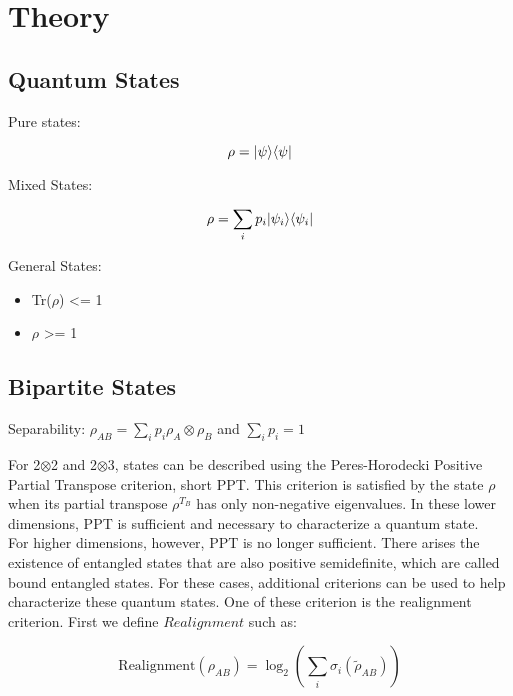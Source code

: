 \chapter{Theory}

\section{Quantum States}

Pure states:

\begin{equation}
    \rho = \lvert\psi\rangle\langle\psi\rvert
\end{equation}

Mixed States:

\begin{equation}
    \rho = \sum_{i} p_i \lvert\psi_i\rangle\langle\psi_i\rvert
\end{equation}

General States:

\begin{itemize}
    \item Tr($\rho$) <= 1
    \item $\rho$ >= 1
\end{itemize}

\section{Bipartite States}

Separability: $\rho_{AB} = \sum_{i} p_i \rho_A \otimes \rho_B$ and $\sum_{i} p_i = 1$

For 2$\otimes$2 and 2$\otimes$3, states can be described using the Peres-Horodecki Positive Partial Transpose criterion, short PPT.
This criterion is satisfied by the state $\rho$ when its partial transpose $\rho^{T_B}$ has only non-negative eigenvalues.
In these lower dimensions, PPT is sufficient and necessary to characterize a quantum state.\\

For higher dimensions, however, PPT is no longer sufficient. There arises the existence of entangled states that are also positive semidefinite, which are called bound entangled states.
For these cases, additional criterions can be used to help characterize these quantum states. One of these criterion is the realignment criterion. First we define $Realignment$ such as:

\begin{equation}
    \text{Realignment}(\rho_{AB}) = \log_2({\sum_{i}\sigma_i(\tilde{\rho}_{AB})})
\end{equation}

